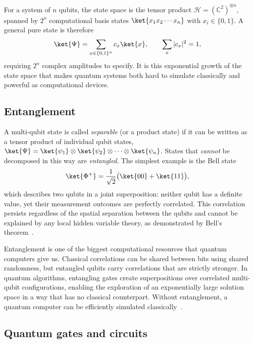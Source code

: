 For a system of $n$ qubits, the state space is the tensor product
$\mathcal{H} = (\mathbb{C}^2)^{\otimes n}$, spanned by $2^n$ computational
basis states $\ket{x_1 x_2 \cdots x_n}$ with $x_i\in\{0,1\}$. A general pure
state is therefore
\begin{equation}
  \label{eq:nqubit}
  \ket{\Psi} = \sum_{x\in\{0,1\}^n} c_x \ket{x},
  \qquad \sum_x |c_x|^2 = 1,
\end{equation}
requiring $2^n$ complex amplitudes to specify. It is this exponential growth of
the state space that makes quantum systems both hard to simulate classically and
powerful as computational devices.


\subsection{Entanglement}
\label{sec:entanglement}

A multi-qubit state is called \emph{separable} (or a product state) if it can be
written as a tensor product of individual qubit states,
$\ket{\Psi} = \ket{\psi_1}\otimes\ket{\psi_2}\otimes\cdots\otimes\ket{\psi_n}$.
States that \emph{cannot} be decomposed in this way are \emph{entangled}. The
simplest example is the Bell state
\begin{equation}
  \label{eq:bell}
  \ket{\Phi^+} = \frac{1}{\sqrt{2}}\bigl(\ket{00}+\ket{11}\bigr),
\end{equation}
which describes two qubits in a joint superposition: neither qubit has a definite
value, yet their measurement outcomes are perfectly correlated. This correlation
persists regardless of the spatial separation between the qubits and cannot be
explained by any local hidden variable theory, as demonstrated by Bell's
theorem~\cite{bell1964}.

Entanglement is one of the biggest computational resources that quantum computers give us.
Classical correlations can be shared between bits using shared
randomness, but entangled qubits carry correlations that are strictly stronger.
In quantum algorithms, entangling gates create superpositions over correlated
multi-qubit configurations, enabling the exploration of an exponentially large
solution space in a way that has no classical counterpart. Without entanglement, a
quantum computer can be efficiently simulated classically~\cite{nielsen2010}.


\subsection{Quantum gates and circuits}
\label{sec:gates}

